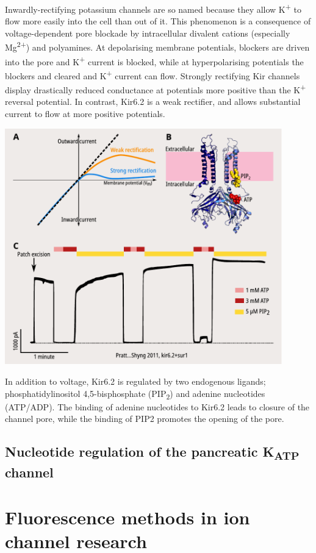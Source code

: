 Inwardly-rectifying potassium channels are so named because they allow K\textsuperscript{+} to flow more easily into the cell than out of it.
This phenomenon is a consequence of voltage-dependent pore blockade by intracellular divalent cations (especially Mg\textsuperscript{2+}) and polyamines.
At depolarising membrane potentials, blockers are driven into the pore and K\textsuperscript{+} current is blocked, while at hyperpolarising potentials the blockers and cleared and K\textsuperscript{+} current can flow.
Strongly rectifying Kir channels display drastically reduced conductance at potentials more positive than the K\textsuperscript{+} reversal potential.
In contrast, Kir6.2 is a weak rectifier, and allows substantial current to flow at more positive potentials.

\includegraphics[width=0.9\textwidth]{rectification.pdf}

In addition to voltage, Kir6.2 is regulated by two endogenous ligands; 
phosphatidylinositol 4,5-bisphosphate (PIP\textsubscript{2}) and adenine nucleotides (ATP/ADP).
The binding of adenine nucleotides to Kir6.2 leads to closure of the channel pore, while the binding of PIP2 promotes the opening of the pore.


\subsection{Nucleotide regulation of the pancreatic K\textsubscript{ATP} channel}

\section{Fluorescence methods in ion channel research}


